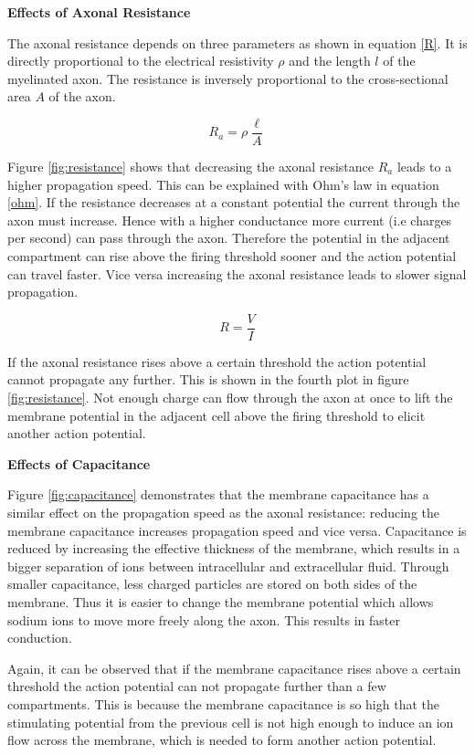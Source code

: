 \documentclass{scrartcl}
\begin{document}
\textbf{Effects of Axonal Resistance}

The axonal resistance depends on three parameters as shown in equation \ref{R}. It is directly proportional to the electrical resistivity $\rho$ and the length $l$ of the myelinated axon. The resistance is inversely proportional to the cross-sectional area $A$ of the axon. 

\begin{equation}\label{R}
R_a=\rho \frac{\ell}{A}
\end{equation}

Figure \ref{fig:resistance} shows that decreasing the axonal resistance $R_a$ leads to a higher propagation speed. This can be explained with Ohm's law in equation \ref{ohm}. If the resistance decreases at a constant potential the current through the axon must increase. Hence with a higher conductance more current (i.e charges per second) can pass through the axon. Therefore the potential in the adjacent compartment can rise above the firing threshold sooner and the action potential can travel faster. Vice versa increasing the axonal resistance leads to slower signal propagation.

\begin{equation}\label{ohm}
	R = \frac{V}{I}
\end{equation}

If the axonal resistance rises above a certain threshold the action potential cannot propagate any further. This is shown in the fourth plot in figure \ref{fig:resistance}. Not enough charge can flow through the axon at once to lift the membrane potential in the adjacent cell above the firing threshold to elicit another action potential. 

\textbf{Effects of Capacitance}

Figure \ref{fig:capacitance} demonstrates that the membrane capacitance has a similar effect on the propagation speed as the axonal resistance: reducing the membrane capacitance increases propagation speed and vice versa. Capacitance is reduced by increasing the effective thickness of the membrane, which results in a bigger separation of ions between intracellular and extracellular fluid. Through smaller capacitance, less charged particles are stored on both sides of the membrane. Thus it is easier to change the membrane potential which allows sodium ions to move more freely along the axon. This results in faster conduction.

Again, it can be observed that if the membrane capacitance rises above a certain threshold the action potential can not propagate further than a few compartments. This is because the membrane capacitance is so high that the stimulating potential from the previous cell is not high enough to induce an ion flow across the membrane, which is needed to form another action potential. 
\end{document}
